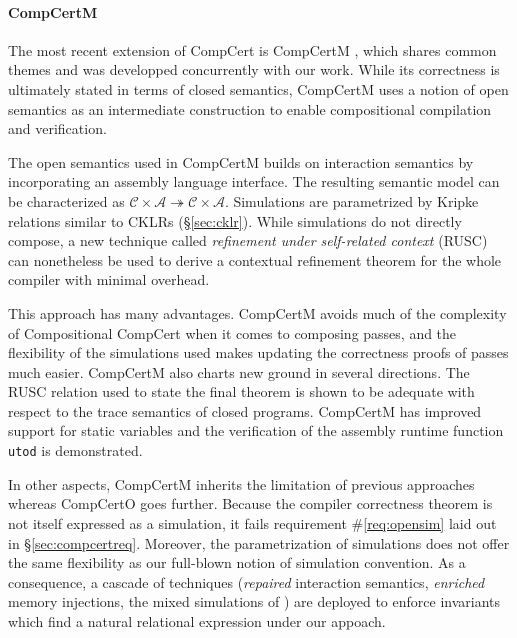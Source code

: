 \documentclass[sigplan,10pt,review]{acmart}
\begin{document}

\paragraph{CompCertM} %

The most recent extension of CompCert is CompCertM \cite{compcertm},
which shares common themes and was developped concurrently
with our work.
While its correctness
is ultimately stated in terms of closed semantics,
CompCertM uses a notion of open semantics
as an intermediate construction
to enable compositional compilation and verification.

The open semantics used in CompCertM
builds on interaction semantics
by incorporating an assembly language interface.
The resulting semantic model can be characterized as
$\mathcal{C} \times \mathcal{A} \twoheadrightarrow
 \mathcal{C} \times \mathcal{A}$.
Simulations
are parametrized by Kripke relations similar to CKLRs (\S\ref{sec:cklr}).
While simulations do not directly compose,
a new technique called \emph{refinement under self-related context}
(RUSC)
can nonetheless be used to derive a contextual refinement theorem
for the whole compiler with minimal overhead.

This approach has many advantages.
CompCertM avoids much of the complexity
of Compositional CompCert
when it comes to composing passes,
and the flexibility of the simulations used
makes updating the correctness proofs of passes much easier.
CompCertM also charts new ground in several directions.
The RUSC relation used to state the final theorem
is shown to be adequate with respect to the trace semantics
of closed programs.
CompCertM has improved support for static variables
and the verification of
the assembly runtime function \texttt{utod} is demonstrated.

In other aspects, CompCertM inherits the limitation of previous
approaches whereas CompCertO goes further.  Because the compiler
correctness theorem is not itself expressed as a simulation, it fails
requirement \#\ref{req:opensim} laid out in \S\ref{sec:compcertreq}.
Moreover, the parametrization of simulations does not offer the same
flexibility as our full-blown notion of simulation convention.  As a
consequence, a cascade of techniques (\emph{repaired} interaction
semantics, \emph{enriched} memory injections, the mixed simulations of
\cite{pilsner}) are deployed to enforce invariants which find a
natural relational expression under our appoach.
\end{document}
